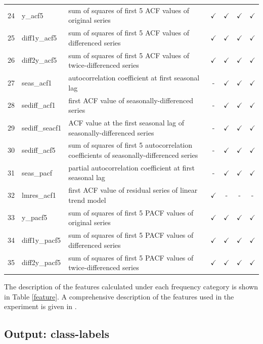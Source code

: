 \documentclass[11pt,a4paper,]{article}
\def\yes{$\checkmark$}
\begin{document}
\begin{table}[!htp]
\begin{tabular}{llp{}cccc}
24 & y\_acf5        & sum of squares of first 5 ACF values of original series                                 & \yes  & \yes & \yes & \yes\\
25 & diff1y\_acf5   & sum of squares of first 5 ACF values of differenced series                              & \yes  & \yes & \yes & \yes\\
26 & diff2y\_acf5   & sum of squares of first 5 ACF values of twice-differenced series                        & \yes  & \yes & \yes & \yes \\
27 & seas\_acf1     & autocorrelation coefficient at first seasonal lag                                       & -     & \yes & \yes & \yes\\
28 & sediff\_acf1   & first ACF value of seasonally-differenced series                                        & -     & \yes & \yes & \yes\\
29 & sediff\_seacf1 & ACF value at the first seasonal lag of seasonally-differenced series                    & -     & \yes & \yes & \yes\\
30 & sediff\_acf5   & sum of squares of first 5 autocorrelation coefficients of seasonally-differenced series & -     & \yes & \yes & \yes\\
31 & seas\_pacf     & partial autocorrelation coefficient at first seasonal lag & -     & \yes & \yes & \yes\\
32 & lmres\_acf1    & first ACF value of residual series of linear trend model                                & \yes  & - & - & -\\
33 & y\_pacf5       & sum of squares of first 5 PACF values of original series                                & \yes  & \yes & \yes & \yes\\
34 & diff1y\_pacf5  & sum of squares of first 5 PACF values of differenced series                             & \yes  & \yes & \yes & \yes\\
35 & diff2y\_pacf5  & sum of squares of first 5 PACF values of twice-differenced series                       & \yes  & \yes & \yes & \yes\\
\bottomrule
\end{tabular}
\end{table}

The description of the features calculated under each frequency category
is shown in Table \ref{feature}. A comprehensive description of the
features used in the experiment is given in \textcite{fforms}.

\subsection{Output: class-labels}\label{output-class-labels}
\end{document}
